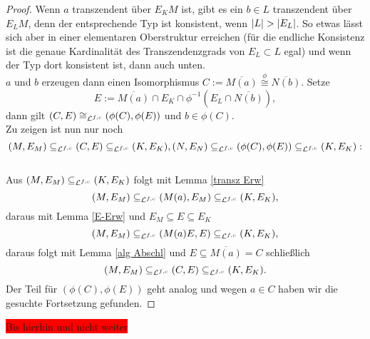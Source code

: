 \begin{proof}
    	Wenn $a$ transzendent über $E_KM$ ist, gibt es ein $b\in L$ transzendent über $E_LM$, denn der entsprechende Typ ist konsistent, wenn ${\left| L \right|}>{\left| E_L \right|}$. So etwas lässt sich aber in einer elementaren Oberstruktur erreichen (für die endliche Konsistenz ist die genaue Kardinalität des Transzendenzgrads von $E_L\subset L$ egal) und wenn der Typ dort konsistent ist, dann auch unten.\\
    	$a$ und $b$ erzeugen dann einen Isomorphismus $C:=\overline{M(a)}\overset{\phi}{\cong}\overline{N(b)}$. Setze $$E:=\overline{M(a)}\cap E_K\cap\phi^{-1}(E_L\cap\overline{N(b)}),$$ dann gilt $(C,E)\cong_{\mathcal{L}^{f,c}}(\phi(C),\phi(E))$ und $b\in\phi(C)$.\\
    	Zu zeigen ist nun nur noch $$(M,E_M)\subseteq_{\mathcal{L}^{f,c}}(C,E)\subseteq_{\mathcal{L}^{f,c}}(K,E_K),(N,E_N)\subseteq_{\mathcal{L}^{f,c}}(\phi(C),\phi(E))\subseteq_{\mathcal{L}^{f,c}}(K,E_K):$$\\
    	Aus $(M,E_M)\subseteq_{\mathcal{L}^{f,c}}(K,E_K)$ folgt mit Lemma \ref{transz Erw} $$(M,E_M)\subseteq_{\mathcal{L}^{f,c}}(M(a),E_M)\subseteq_{\mathcal{L}^{f,c}}(K,E_K),$$ daraus mit Lemma \ref{E-Erw} und $E_M\subseteq E\subseteq E_K$ $$(M,E_M)\subseteq_{\mathcal{L}^{f,c}}(M(a)E,E)\subseteq_{\mathcal{L}^{f,c}}(K,E_K),$$ daraus folgt mit Lemma \ref{alg Abschl} und $E\subseteq\overline{M(a)}=C$ schließlich $$(M,E_M)\subseteq_{\mathcal{L}^{f,c}}(C,E)\subseteq_{\mathcal{L}^{f,c}}(K,E_K).$$
    	Der Teil für $(\phi(C),\phi(E))$ geht analog und wegen $a\in C$ haben wir die gesuchte Fortsetzung gefunden.
    \end{proof}
    
    \colorbox{red}{Bis hierhin und nicht weiter}
    \newpage
    
